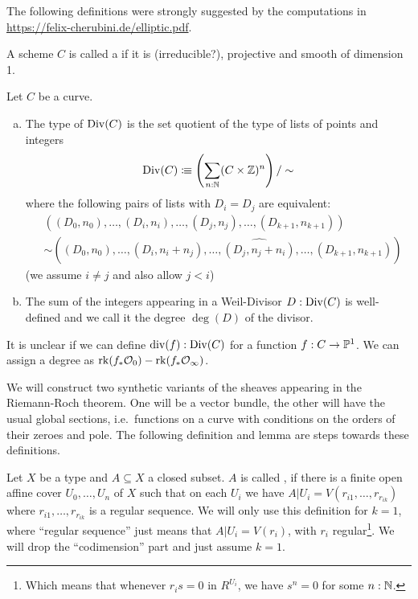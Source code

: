 
The following definitions were strongly suggested by the computations in \href{https://felix-cherubini.de/elliptic.pdf}{https://felix-cherubini.de/elliptic.pdf}.

\begin{definition}
  A scheme \(C\) is called a  if it is (irreducible?), projective and smooth of dimension 1.
\end{definition}

\begin{definition}
  Let \(C\) be a curve.
  \begin{enumerate}[(a)]
  \item The type of  \(\mathrm{Div}(C)\) is the set quotient of the type of lists
  of points and integers
  \[
    \mathrm{Div}(C)\vcentcolon\mspace{-1.2mu}\equiv \left(\sum_{n:\mathbb{N}}(C\times \mathbb{Z})^n\right)/\sim
  \]
  where the following pairs of lists with \(D_i=D_j\) are equivalent:
  \begin{align*}
    &((D_0,n_0),\dots, (D_i,n_i),\dots, (D_j,n_j),\dots, (D_{k+1},n_{k+1})) \\
    &\sim((D_0,n_0),\dots,(D_i,n_i+n_j),\dots, \widehat{(D_j,n_j+n_i)},\dots, (D_{k+1},n_{k+1}))
  \end{align*}
  (we assume \(i\neq j\) and also allow \(j<i\))
  \item The sum of the integers appearing in a Weil-Divisor \(D:\mathrm{Div}(C)\) is well-defined and we call it the degree \(\deg(D)\) of the divisor.
  \end{enumerate}
\end{definition}

It is unclear if we can define \(\mathrm{div}(f):\mathrm{Div}(C)\) for a function \(f:C\to \mathbb{P}^1\). We can assign a degree as \(\mathrm{rk}(f_\ast\mathcal{O}_0)-\mathrm{rk}(f_\ast\mathcal{O}_\infty)\).

We will construct two synthetic variants of the sheaves appearing in the Riemann-Roch theorem. One will be a vector bundle, the other will have the usual global sections, i.e.\ functions on a curve with conditions on the orders of their zeroes and pole. The following definition and lemma are steps towards these definitions.

\begin{definition}
  Let \(X\) be a type and \(A\subseteq X\) a closed subset.
  \(A\) is called , if there is a finite open affine cover \(U_0,\dots,U_n\) of \(X\) such that on each \(U_i\) we have \(A|U_i=V(r_{i1},\dots,r_{r_{ik}})\) where \(r_{i1},\dots,r_{r_{ik}}\) is a regular sequence. We will only use this definition for \(k=1\), where ``regular sequence'' just means that \(A|U_i=V(r_i)\), with \(r_i\) regular\footnote{Which means that whenever \(r_is=0\)  in \(R^{U_i}\), we have \(s^n=0\) for some \(n:\mathbb{N}\).}. We will drop the ``codimension'' part and just assume \(k=1\). 
\end{definition}

